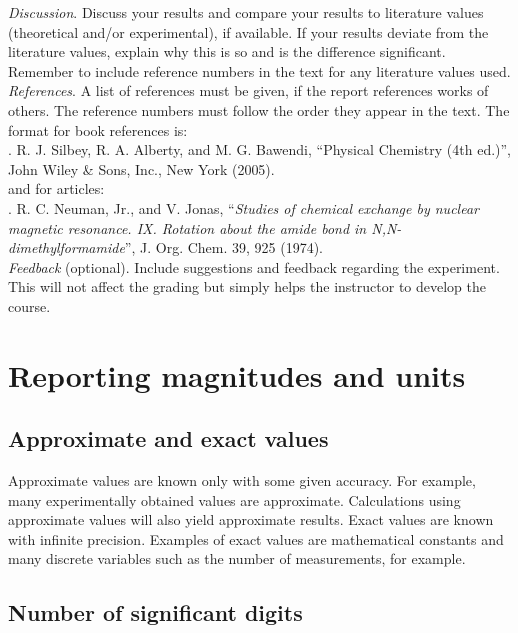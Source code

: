 \documentclass[byrevtex,amssymb,aps,pra,floatfix,letterpaper]{revtex4}
\begin{document}
\noindent
\textit{Discussion}. Discuss your results and compare your results to literature values (theoretical and/or experimental), if available. 
If your results deviate from the literature values, explain why this is so and is the difference significant. Remember to include reference numbers in the text for any literature values used.\\

\noindent
\textit{References}. A list of references must be given, if the report references works of others. The reference numbers must follow the order they appear in the text. The format for book
references is:\\

. R. J. Silbey, R. A. Alberty, and M. G. Bawendi, ``Physical Chemistry (4th ed.)'', John Wiley \&
Sons, Inc., New York (2005).\\

\noindent
and for articles:\\

. R. C. Neuman, Jr., and V. Jonas, ``\textit{Studies of chemical exchange by nuclear magnetic
resonance. IX. Rotation about the amide bond in N,N-dimethylformamide}'', J. Org. Chem. 39, 925 (1974).\\

\noindent
\textit{Feedback} (optional). Include suggestions and feedback regarding the experiment. This will not affect the grading but simply helps the instructor to develop the course.

\section{Reporting magnitudes and units}
\label{sec5}

\subsection{Approximate and exact values}

Approximate values are known only with some given accuracy. For example, many experimentally obtained values are approximate. Calculations using approximate values will also yield approximate results. Exact values are known with infinite precision. Examples of exact values are mathematical constants and many discrete variables such as the number of measurements, for example.

\subsection{Number of significant digits}
\end{document}
